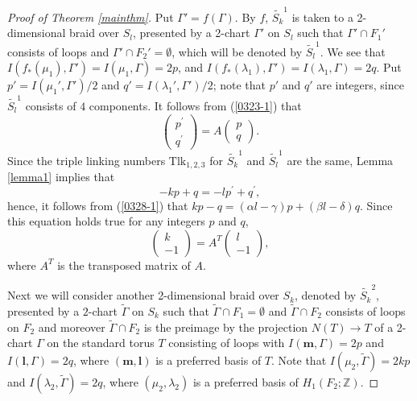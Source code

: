 \documentclass[a4paper,11pt]{amsart}
\numberwithin{equation}{section}
\begin{document}
\begin{proof}[Proof of Theorem \ref{mainthm}]
\begin{sloppypar}
Put $\Gamma'=f(\Gamma)$. By $f$, $\widetilde{S_k}^1$ is taken to a 2-dimensional braid over $S_l$, presented by a 2-chart $\Gamma'$ on $S_l$ such that $\Gamma' \cap F_1'$ consists of loops and $\Gamma' \cap F_2'=\emptyset$, which will be denoted by $\widetilde{S_l}^1$. 
We see that $I(f_*(\mu_1), \Gamma')=I(\mu_1, \Gamma)=2p$, and  $I(f_*(\lambda_1), \Gamma')=I(\lambda_1, \Gamma)=2q$. 
Put $p'=I(\mu_1', \Gamma')/2$ and $q'=I(\lambda_1', \Gamma')/2$; note that $p'$ and $q'$ are integers, since $\widetilde{S_l}^1$ consists of $4$ components. 
It follows from (\ref{0323-1}) that 
\begin{equation}\label{0328-1}
\begin{pmatrix} p^\prime \\ q^\prime \end{pmatrix}=A\begin{pmatrix} p \\ q \end{pmatrix}.
\end{equation}
Since the triple linking numbers $\mathrm{Tlk}_{1,2,3}$ for $\widetilde{S_k}^1$ and $\widetilde{S_l}^1$ are the same, Lemma \ref{lemma1} implies that 
\begin{equation}\label{0325-1}
-kp+q=-lp^\prime +q^\prime, 
\end{equation}
hence, it follows from (\ref{0328-1}) that
$
k p-q=(\alpha l-\gamma) p+(\beta l-\delta) q. 
$
Since this equation holds true for any integers $p$ and $q$, 
 \begin{equation}\label{eq:0303-01}
\begin{pmatrix}
k \\ -1
\end{pmatrix}= A^T \begin{pmatrix} l \\ -1 \end{pmatrix},
\end{equation}
where $A^T$ is the transposed matrix of $A$. 

Next we will consider another 2-dimensional braid over $S_k$, denoted by $\widetilde{S_k}^2$, presented by a $2$-chart $\widetilde{\Gamma}$ on $S_k$ such that $\widetilde{\Gamma} \cap F_1=\emptyset$ and $\widetilde{\Gamma} \cap F_2$ consists of loops on $F_2$ and moreover $\widetilde{\Gamma} \cap F_2$ is the preimage by the projection $N(T) \to T$ of a 2-chart $\Gamma$ on the standard torus $T$ consisting of loops with $I(\mathbf{m}, \Gamma)=2p$ and $I(\mathbf{l}, \Gamma)=2q$, where $(\mathbf{m}, \mathbf{l})$ is a preferred basis of $T$. 
Note that $I(\mu_2, \widetilde{\Gamma})=2kp$ and $I(\lambda_2, \widetilde{\Gamma})=2q$, where $(\mu_2, \lambda_2)$ is a preferred basis of $H_1(F_2; \mathbb{Z})$. 


\end{sloppypar}
\end{proof}
\end{document}
